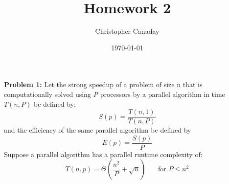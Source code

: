 \documentclass{article}
\title{Homework 2}
\author{Christopher Canaday}
\date{\today}
\begin{document}
    \maketitle
    \textbf{Problem 1:} Let the strong speedup of a problem of size n that is computationally solved using \textit{P} processors
by a parallel algorithm in time $T(n, P)$ be defined by:
    \begin{equation}
        S(p) = \frac{T(n,1)}{T(n,P)}
    \end{equation}
    and the efficiency of the same parallel algorithm be defined by
    \begin{equation}
        E(p) = \frac{S(p)}{P}
    \end{equation}
    Suppose a parallel algorithm has a parallel runtime complexity of:
    \begin{equation}
        T(n,p) = \Theta(\frac{n^2}{P} + \sqrt{n}) \phantom{text}\text{for } P \leq n^2
    \end{equation}
\end{document}
